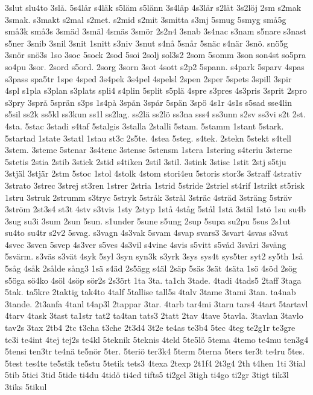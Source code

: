 {3slut
slu4to
3slå.
5s4lår
s4läk
s5läm
s5länn
3s4läp
4s3lär
s2lät
3s2löj
2sm
s2mak
3smak.
s3makt
s2mal
s2met.
s2mid
s2mit
3smitta
s3mj
5smug
5smyg
små5g
små3k
små3s
3smäd
3smäl
4smäs
3smör
2s2n4
3snab
3s4nac
s3nam
s5nare
s3nast
s5ner
3snib
3snil
3snit
1snitt
s3niv
3snut
s4nå
5snår
5snäc
s4när
3snö.
snö5g
3snör
snö3s
1so
3soc
5sock
2sod
5soi
2solj
sol3s2
2som
5somm
3son
son4st
so5pra
so4pu
3sor.
2sord
s5ord.
2sorg
3sorn
3sot
4sott
s2p2
5spann.
s4park
5sparv
4spas
s3pass
spa5tr
1spe
4sped
3s4pek
3s4pel
4spelsl
2spen
2sper
5spets
3spill
3spir
4spl
s1pla
s3plan
s3plats
spli4
s4plin
5split
s5plä
4spre
s3pres
4s3pris
3sprit
2spro
s3pry
3språ
5sprän
s3ps
1s4på
3spån
3spår
5spän
3spö
4s1r
4s1s
s5sad
sse4lin
s5sil
ss2k
ss5kl
ss3kun
ss1l
ss2lag.
ss2lä
ss2lö
ss3na
sss4
ss3unn
s2sv
ss3vi
s2t
2st.
4sta.
5stac
3stadi
s4taf
5stalgis
3stalla
2stalli
5stam.
5stamm
1stant
5stark.
5startad
1state
3statl
1stau
st3c
2s5te.
4stea
5steg.
s4tek.
2stekn
5stekt
s4tell
3stem.
3steme
5stenar
3s4tene
3stense
5stensm
1stera
1stering
s4teriu
3sterne
5stetis
2stia
2stib
3stick
2stid
s4tiken
2stil
3stil.
3stink
3stisc
1stit
2stj
s5tju
3stjäl
3stjär
2stm
5stoc
1stol
4stolk
4stom
stori4eu
5storis
stor3s
3straff
4strativ
3strato
3strec
3strej
st3ren
1strer
2stria
1strid
5stride
2striel
st4rif
1strikt
st5risk
1stru
3struk
2strumm
s3tryc
5stryk
5stråk
3strål
3sträc
4sträd
3sträng
5sträv
3ström
2st3s4
st3t
4stv
s3tvis
1sty
2styp
1stå
4ståg
5stål
1stä
3stäl
1stö
1su
su4b
3sug
su3i
3sum
2sun
5sun.
s1under
5sune
s5ung
2sup
5supa
su2pu
5sus
2s1ut
su4to
su4tr
s2v2
5svag.
s3vagn
4s3vak
5svam
4svap
svars3
3svart
4svas
s3vat
4svec
3sven
5svep
4s3ver
s5ves
4s3vil
s4vine
4svis
s5vitt
s5våd
3svåri
3sväng
5svärm.
s3väs
s3vät
4syk
5syl
3syn
syn3k
s3yrk
3sys
sys4t
sys5ter
syt2
sy5th
1så
5såg
4såk
2sålde
sång3
1sä
s4äd
2s5ägg
s4äl
2säp
5säs
3sät
4säta
1sö
4söd
2sög
s5öga
sö4ko
4söl
4söp
sör2s
2s3ört
1ta
3ta.
ta1ch
3tade.
4tadi
4tads5
2taff
3taga
5tak.
ta5kre
2taktig
tak4to
4talf
5tallise
tall5s
4talv
3tame
3tami
3tan.
ta4nab
3tande.
2t3anfa
4tanl
t4ap3l
2tappar
3tar.
4tarb
tar4mi
3tarn
tars4
4tart
5tartavl
4tarv
4task
3tast
ta1str
tat2
ta4tan
tats3
2tatt
2tav
4tave
5tavla.
3tavlan
3tavlo
tav2s
3tax
2tb4
2tc
t3cha
t3che
2t3d4
3t2e
te4as
te3b4
5tec
4teg
te2g1r
te3gre
te3i
te4int
4tej
tej2s
te4kl
5teknik
5teknis
4teld
5te5lö
5tema
4temo
te4mu
ten3g4
5tensi
ten3tr
te4nä
te5nör
5ter.
5teriö
ter3k4
5term
5terna
5ters
ter3t
te4ru
5tes.
5test
tes4te
te5stik
te5stu
5tetik
tets3
4texa
2texp
2t1f4
2t3g4
2th
t4hen
1ti
3tial
5tib
5tici
3tid
5tide
ti4du
4tidö
ti4ed
tifts5
ti2gel
3tigh
ti4go
ti2gr
3tigt
tik3l
3tiks
5tikul
}
